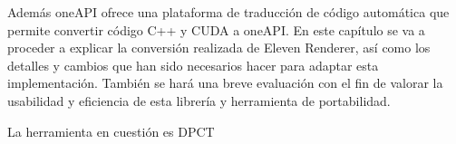 Además oneAPI ofrece una plataforma de traducción de código automática que permite convertir código C++ y CUDA a oneAPI. En este capítulo se va a proceder a explicar la conversión realizada de Eleven Renderer, así como los detalles y cambios que han sido necesarios hacer para adaptar esta implementación. También se hará una breve evaluación con el fin de valorar la usabilidad y eficiencia de esta librería y herramienta de portabilidad.

La herramienta en cuestión es DPCT


